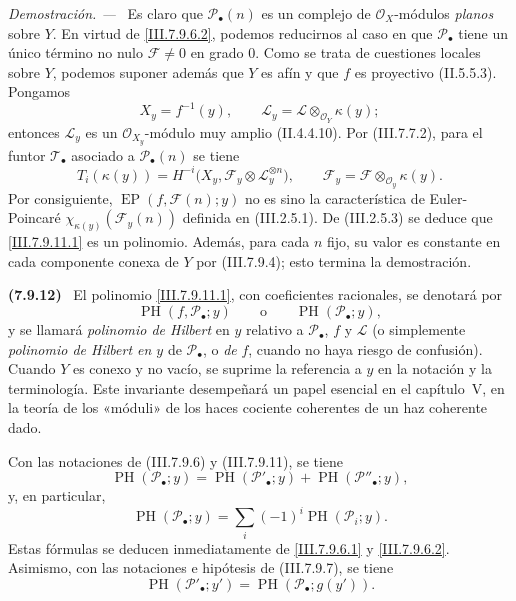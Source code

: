\documentclass[10pt,oneside]{book}
\newcommand{\kres}{\kappa}
\newcommand{\sref}[2][]{\textup{(#2)}}
\newenvironment{env}[1][]{\par\medskip\noindent\textbf{(#1)}\ }{\par}
\newenvironment{proof}{\par\medskip\noindent\textit{Demostración. ---\ }}{\par}
\providecommand{\setmin}{-}%
\begin{document}
\begin{proof}
Es claro que $\mathscr P_\bullet(n)$ es un complejo de
$\mathscr O_X$-módulos \emph{planos} sobre $Y$. En virtud de
\eqref{III.7.9.6.2}, podemos reducirnos al caso en que
$\mathscr P_\bullet$ tiene un único término no nulo
$\mathscr F\neq0$ en grado $0$. Como se trata de cuestiones
locales sobre $Y$, podemos suponer además que $Y$ es afín y que
$f$ es proyectivo \sref[II]{II.5.5.3}. Pongamos
\[
  X_y=f^{-1}(y),\qquad
  \mathscr L_y=\mathscr L\otimes_{\mathscr O_Y}\kres(y);
\]
entonces $\mathscr L_y$ es un $\mathscr O_{X_y}$-módulo muy amplio
\sref[II]{II.4.4.10}. Por \sref{III.7.7.2}, para el funtor
$\mathscr T_\bullet$ asociado a $\mathscr P_\bullet(n)$ se tiene
\[
  T_i(\kres(y))
  =
  H^{-i}\bigl(
    X_y,\mathscr F_y\otimes\mathscr L_y^{\otimes n}\bigr),
  \qquad
  \mathscr F_y=\mathscr F\otimes_{\mathscr O_y}\kres(y).
\]
Por consiguiente, $\operatorname{EP}(f,\mathscr F(n);y)$ no es
sino la característica de Euler-Poincaré
$\chi_{\kres(y)}(\mathscr F_y(n))$ definida en
\sref{III.2.5.1}. De \sref{III.2.5.3} se deduce que
\eqref{III.7.9.11.1} es un polinomio. Además, para cada $n$ fijo,
su valor es constante en cada componente conexa de $Y$ por
\sref{III.7.9.4}; esto termina la demostración.
\end{proof}

\begin{env}[7.9.12]
\label{III.7.9.12}
El polinomio \eqref{III.7.9.11.1}, con coeficientes racionales, se
denotará por
\[
  \operatorname{PH}(f,\mathscr P_\bullet;y)
  \qquad\text{o}\qquad
  \operatorname{PH}(\mathscr P_\bullet;y),
\]
y se llamará \emph{polinomio de Hilbert} en $y$ relativo a
$\mathscr P_\bullet$, $f$ y $\mathscr L$ (o simplemente
\emph{polinomio de Hilbert en $y$} de $\mathscr P_\bullet$, o \emph{de}
$f$, cuando no haya riesgo de confusión). Cuando $Y$ es conexo y
no vacío, se suprime la referencia a $y$ en la notación y la
terminología. Este invariante desempeñará un papel esencial en el
capítulo~V, en la teoría de los «móduli» de los haces cociente
coherentes de un haz coherente dado.

Con las notaciones de \sref{III.7.9.6} y
\sref{III.7.9.11}, se tiene
\[
  \operatorname{PH}(\mathscr P_\bullet;y)
  =
  \operatorname{PH}(\mathscr P'_\bullet;y)
  +
  \operatorname{PH}(\mathscr P''_\bullet;y),
  \tag{7.9.12.1}\label{III.7.9.12.1}
\]
y, en particular,
\[
  \operatorname{PH}(\mathscr P_\bullet;y)
  =
  \sum_i(\setmin 1)^i\operatorname{PH}(\mathscr P_i;y).
  \tag{7.9.12.2}\label{III.7.9.12.2}
\]
Estas fórmulas se deducen inmediatamente de
\eqref{III.7.9.6.1} y \eqref{III.7.9.6.2}. Asimismo, con las
notaciones e hipótesis de \sref{III.7.9.7}, se tiene
\[
  \operatorname{PH}(\mathscr P'_\bullet;y')
  =
  \operatorname{PH}(\mathscr P_\bullet;g(y')).
  \tag{7.9.12.3}\label{III.7.9.12.3}
\]
\end{env}
\end{document}
